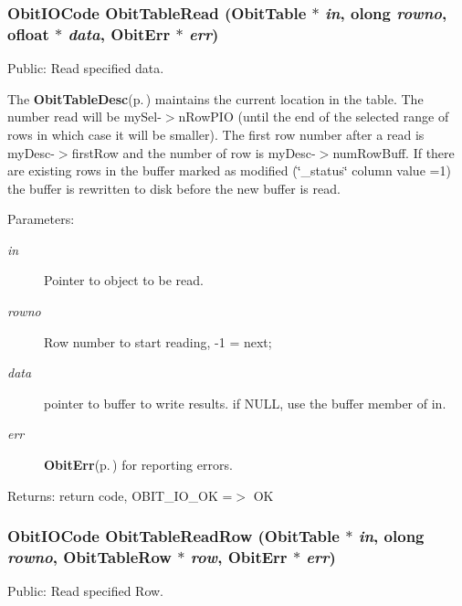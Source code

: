 \subsubsection{\setlength{\rightskip}{0pt plus 5cm}Obit\-IOCode Obit\-Table\-Read ({\bf Obit\-Table} $\ast$ {\em in}, {\bf olong} {\em rowno}, {\bf ofloat} $\ast$ {\em data}, {\bf Obit\-Err} $\ast$ {\em err})}\label{ObitTable_8c_a26}


Public: Read specified data. 

The {\bf Obit\-Table\-Desc}{\rm (p.\,\pageref{structObitTableDesc})} maintains the current location in the table. The number read will be my\-Sel-$>$n\-Row\-PIO (until the end of the selected range of rows in which case it will be smaller). The first row number after a read is my\-Desc-$>$first\-Row and the number of row is my\-Desc-$>$num\-Row\-Buff. If there are existing rows in the buffer marked as modified (\char`\"{}\_\-status\char`\"{} column value =1) the buffer is rewritten to disk before the new buffer is read. \begin{Desc}
\item[Parameters:]
\begin{description}
\item[{\em in}]Pointer to object to be read. \item[{\em rowno}]Row number to start reading, -1 = next; \item[{\em data}]pointer to buffer to write results. if NULL, use the buffer member of in. \item[{\em err}]{\bf Obit\-Err}{\rm (p.\,\pageref{structObitErr})} for reporting errors. \end{description}
\end{Desc}
\begin{Desc}
\item[Returns:]return code, OBIT\_\-IO\_\-OK =$>$ OK \end{Desc}
\subsubsection{\setlength{\rightskip}{0pt plus 5cm}Obit\-IOCode Obit\-Table\-Read\-Row ({\bf Obit\-Table} $\ast$ {\em in}, {\bf olong} {\em rowno}, {\bf Obit\-Table\-Row} $\ast$ {\em row}, {\bf Obit\-Err} $\ast$ {\em err})}\label{ObitTable_8c_a30}


Public: Read specified Row. 

